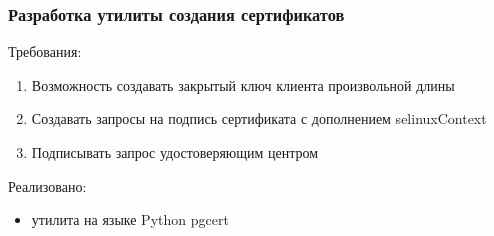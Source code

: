 \documentclass[xcolor={dvipsnames,table}]{beamer}
\begin{document}
\begin{frame}
 \frametitle{Разработка утилиты создания сертификатов}
  

Требования:
\begin{itemize}
\begin{enumerate}
  \item Возможность создавать закрытый ключ клиента произвольной длины
  \item Создавать запросы на подпись сертификата с дополнением selinuxContext
  \item Подписывать запрос удостоверяющим центром
\end{enumerate}
\end{itemize}

\vspace{1 em }

Реализовано:
\begin{itemize}
  \item утилита на языке Python pgcert
\end{itemize}

  
\end{frame}
\end{document}
